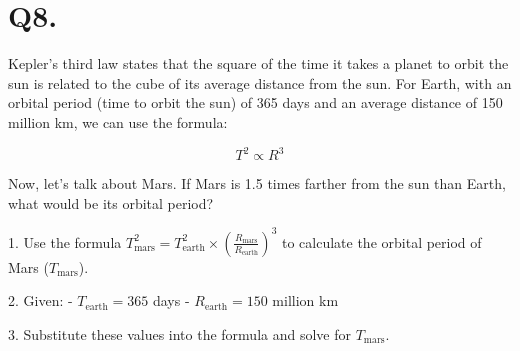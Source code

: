 \documentclass{article}
\begin{document}
\section*{Q8.}
Kepler's third law states that the square of the time it takes a planet to orbit the sun is related to the cube of its average distance from the sun. For Earth, with an orbital period (time to orbit the sun) of 365 days and an average distance of 150 million km, we can use the formula:

\[ T^2 \propto R^3 \]

Now, let's talk about Mars. If Mars is 1.5 times farther from the sun than Earth, what would be its orbital period? 

1. Use the formula \( T_{\text{mars}}^2 = T_{\text{earth}}^2 \times \left(\frac{R_{\text{mars}}}{R_{\text{earth}}}\right)^3 \) to calculate the orbital period of Mars (\(T_{\text{mars}}\)).
  
2. Given:
   - \( T_{\text{earth}} = 365 \) days
   - \( R_{\text{earth}} = 150 \) million km

3. Substitute these values into the formula and solve for \( T_{\text{mars}} \).
\end{document}
